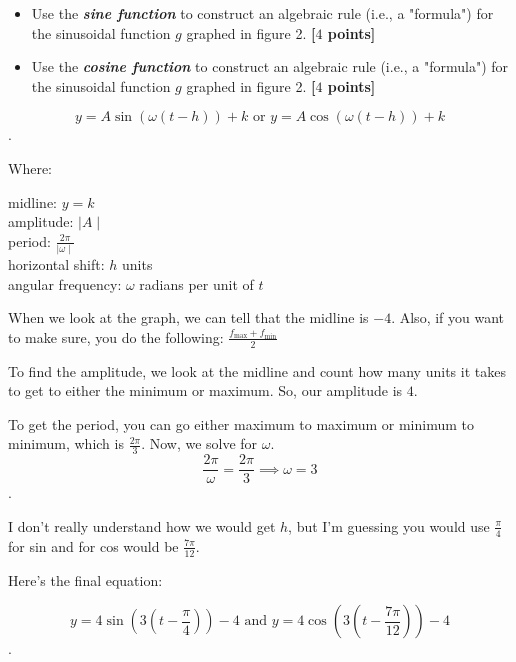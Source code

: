 \newpage

\begin{problem}
  \begin{figure}[H]
    \centering


    \caption{}
  \end{figure}

  \begin{itemize}
    \item Use the \textbf{\textit{sine function}} to construct an algebraic rule
      (i.e., a "formula") for the sinusoidal function $g$ graphed in figure 2.
      \textbf{[$4$ points]}
    \item Use the \textbf{\textit{cosine function}} to construct an algebraic
      rule (i.e., a "formula") for the sinusoidal function $g$ graphed in figure
      2. \textbf{[$4$ points]}
  \end{itemize}
\end{problem}

\begin{solution}
  \[
  y = A\sin(\omega(t - h)) + k \textrm{ or } y = A\cos(\omega(t - h)) + k
  \].

  Where:
  \begin{center}
    midline: $y = k$ \\
    amplitude:  $\mid A \mid$ \\
    period: $\frac{2\pi}{\mid \omega \mid}$ \\
    horizontal shift: $h$ units \\
    angular frequency: $\omega$ radians per unit of $t$
  \end{center}

  When we look at the graph, we can tell that the midline is $-4$. Also, if
  you want to make sure, you do the following:
  $\frac{f_{\textrm{max}} + f_{\textrm{min}}}{2}$

  To find the amplitude, we look at the midline and count how many units it
  takes to get to either the minimum or maximum. So, our amplitude is $4$.

  To get the period, you can go either maximum to maximum or minimum to
  minimum, which is $\frac{2\pi}{3}$. Now, we solve for $\omega$.
  \[
  \frac{2\pi}{\omega} = \frac{2\pi}{3} \implies \omega = 3
  \].

  I don't really understand how we would get $h$, but I'm guessing you would
  use $\frac{\pi}{4}$ for sin and for cos would be $\frac{7\pi}{12}$.

  Here's the final equation:

  \[
  y = 4\sin \left(3 \left(t - \frac{\pi}{4}\right)\right) - 4 \textrm{ and }
  y = 4\cos \left(3 \left(t - \frac{7\pi}{12}\right)\right) - 4
  \].
\end{solution}

